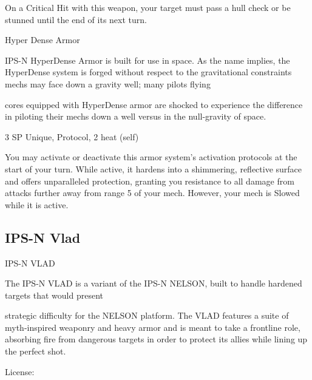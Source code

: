 On a Critical Hit with this weapon, your target must pass a hull check or be stunned until the end  
of its next turn.
 

                                                                                                                    


Hyper Dense Armor  

IPS-N HyperDense Armor is built for use in space. As the name implies, the HyperDense system is forged  
without respect to the gravitational constraints mechs may face down a gravity well; many pilots flying  

cores equipped with HyperDense armor are shocked to experience the difference in piloting their mechs  
down a well versus in the null-gravity of space.   

3 SP  
Unique, Protocol, 2 heat (self)
 
You may activate or deactivate this armor system’s activation protocols at the start of your turn.  
While active, it hardens into a shimmering, reflective surface and offers unparalleled protection,  
granting you resistance to all damage from attacks further away from range 5 of your mech.  
However, your mech is Slowed while it is active. 
 

                                                                                                                      

\subsection{IPS-N Vlad}
                                                                 
                                                     IPS-N VLAD  

The IPS-N VLAD is a variant of the IPS-N NELSON, built to handle hardened targets that would present  

strategic difficulty for the NELSON platform. The VLAD features a suite of myth-inspired weaponry and  
heavy armor and is meant to take a frontline role, absorbing fire from dangerous targets in order to protect  
its allies while lining up the perfect shot.   

                                                                                                                          


                                                      License:
 
